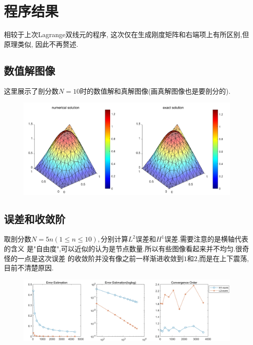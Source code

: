 \documentclass[11pt,reqno]{article}
\numberwithin{equation}{section}
\begin{document}
\section{程序结果}

相较于上次Lagrange双线元的程序, 这次仅在生成刚度矩阵和右端项上有所区别,但原理类似,
因此不再赘述.

\subsection{数值解图像}
这里展示了剖分数$N=10$时的数值解和真解图像(画真解图像也是要剖分的).
\begin{figure}[h]
	\centering
	  \includegraphics[width=\textwidth]{figure.jpg}
\end{figure}

\subsection{误差和收敛阶}
取剖分数$N=5n(1\le n\le 10),$分别计算$L^2$误差和$H^1$误差.需要注意的是横轴代表的含义
是"自由度",可以近似的认为是节点数量.所以有些图像看起来并不均匀.很奇怪的一点是这次误差
的收敛阶并没有像之前一样渐进收敛到$1$和$2$,而是在上下震荡,目前不清楚原因.
\begin{figure}[h]
	\centering
	  \includegraphics[width=\textwidth]{Order.jpg}
\end{figure}
\end{document}
